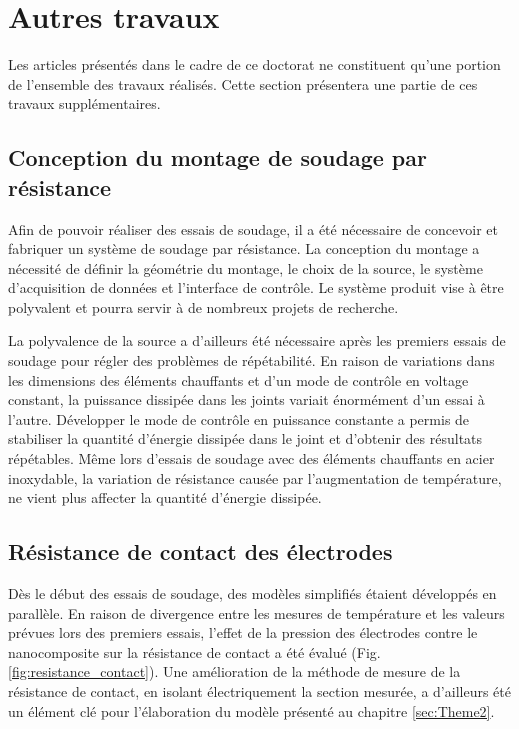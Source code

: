 \label{sec:Discussion}

\section{Autres travaux}

Les articles présentés dans le cadre de ce doctorat ne constituent qu'une portion de l'ensemble des travaux réalisés. 
Cette section présentera une partie de ces travaux supplémentaires. 

\subsection{Conception du montage de soudage par résistance}

Afin de pouvoir réaliser des essais de soudage, il a été nécessaire de concevoir et fabriquer un système de soudage par résistance. 
La conception du montage a nécessité de définir la géométrie du montage, le choix de la source, le système d'acquisition de données et l'interface de contrôle. 
Le système produit vise à être polyvalent et pourra servir à de nombreux projets de recherche. 

La polyvalence de la source a d'ailleurs été nécessaire après les premiers essais de soudage pour régler des problèmes de répétabilité. 
En raison de variations dans les dimensions des éléments chauffants et d'un mode de contrôle en voltage constant, la puissance dissipée dans les joints variait énormément d'un essai à l'autre. 
Développer le mode de contrôle en puissance constante a permis de stabiliser la quantité d'énergie dissipée dans le joint et d'obtenir des résultats répétables. 
Même lors d'essais de soudage avec des éléments chauffants en acier inoxydable, la variation de résistance causée par l'augmentation de température, ne vient plus affecter la quantité d'énergie dissipée. 

\FloatBarrier
\subsection{Résistance de contact des électrodes}

Dès le début des essais de soudage, des modèles simplifiés étaient développés en parallèle. 
En raison de divergence entre les mesures de température et les valeurs prévues lors des premiers essais, l'effet de la pression des électrodes contre le nanocomposite sur la résistance de contact a été évalué (Fig. \ref{fig:resistance_contact}). 
Une amélioration de la méthode de mesure de la résistance de contact, en isolant électriquement la section mesurée, a d'ailleurs été un élément clé pour l'élaboration du modèle présenté au chapitre \ref{sec:Theme2}. 

